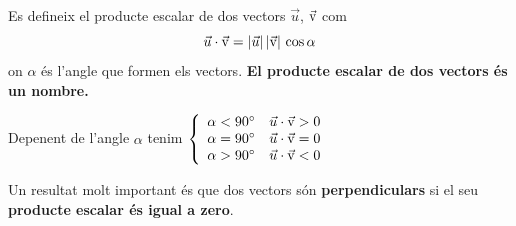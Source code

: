 \begin{theorybox}[Definició]
	Es defineix el producte escalar de dos vectors  $\vec u$, $\vec{\mathrm{v}}$ com
	\begin{equation}
	\label{eq:dotproduct}
	  \vec u \cdot \vec{\mathrm{v}}= |\vec u|\, |\vec{\mathrm{v}}|\, \cos \alpha
	\end{equation}
	on $\alpha$ és l'angle que formen els vectors. \textbf{El producte escalar de dos vectors és un nombre.}
	
	Depenent de l'angle $\alpha$ tenim $\left\{ \begin{array}{ll} 
			 \alpha<90^\circ &   \vec u \cdot \vec{\mathrm{v}}>0 \\ 
			 \alpha=90^\circ &   \vec u \cdot \vec{\mathrm{v}}=0	\\
			 \alpha>90^\circ &  \vec u \cdot \vec{\mathrm{v}}<0 
			 \end{array}\right.$
			 		 
	Un resultat molt important és que dos vectors són \textbf{perpendiculars} si el seu \textbf{producte escalar és igual a zero}.		 
\end{theorybox}

